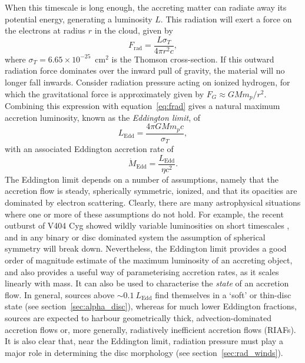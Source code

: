When this timescale is long enough, the accreting matter
can radiate away its potential energy, generating a luminosity $L$. 
This radiation will exert a force on the electrons at radius $r$ in the cloud, 
given by
\begin{equation}
F_{\mathrm{rad}} = \frac{L \sigma_T}{4 \pi r^2 c},
\label{eq:frad}
\end{equation} 
where $\sigma_T = 6.65\times10^{-25}$~cm$^2$ is the Thomson cross-section.
If this outward radiation force dominates over the inward pull of gravity, 
the material will no longer fall inwards. Consider
radiation pressure acting on ionized hydrogen, for which the gravitational
force is approximately given by $F_G \approx G M m_p / r^2$. Combining this expression
with equation~\ref{eq:frad} gives a natural
maximum accretion luminosity, known as the {\em Eddington limit}, of
\begin{equation}
L_{\mathrm{Edd}} = \frac{4 \pi G M m_p c}{\sigma_T},
\label{eq:bondi}
\end{equation} 
with an associated Eddington accretion rate of 
\begin{equation}
\dot{M}_{\mathrm{Edd}} = \frac{L_{\mathrm{Edd}}}{\eta c^2}.
\label{eq:bondi}
\end{equation} 
The Eddington limit depends on a number of assumptions, namely
that the accretion flow is steady, spherically symmetric, ionized,
and that its opacities are dominated by electron scattering.
Clearly, there are many astrophysical situations where one or more
of these assumptions do not hold.
For example, the recent outburst of V404 Cyg showed wildly variable
luminosities on short timescales 
\citep[see, e.g.,][among many, many ATels]{kuulkers_atel2015,motta_atel2015}, 
and in any binary
or disc dominated system the assumption of spherical symmetry will
break down. Nevertheless, the Eddington limit provides a good order of magnitude 
estimate of the maximum luminosity of an accreting object,
and also provides a useful way of parameterising accretion rates,
as it scales linearly with mass. It can also be used
to characterise the {\em state} of an accretion flow.  
In general, sources above $\sim 0.1~L_{\mathrm{Edd}}$ find themselves in a 
`soft' or thin-disc state (see section~\ref{sec:alpha_disc}), 
whereas for much lower Eddington 
fractions, sources are expected to harbour geometrically thick, 
advection-dominated accretion flows
\citep[ADAFs; ][]{narayan1994,narayan1995} or, more generally, 
radiatively inefficient accretion flows (RIAFs).
It is also clear that, near the Eddington limit, radiation pressure
must play a major role in determining the disc morphology 
(see section~\ref{sec:rad_winds}).

